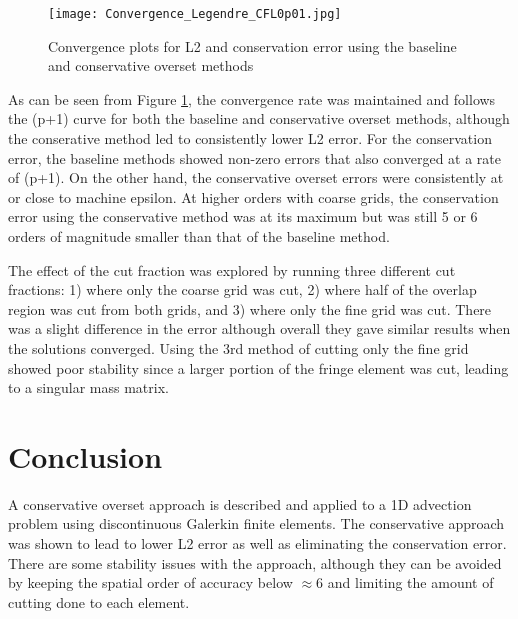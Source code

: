 \documentclass[11pt]{article}
\begin{document}
\begin{figure}
\centering
  \texttt{[image: Convergence\_Legendre\_CFL0p01.jpg]}
  \caption{Convergence plots for L2 and conservation error using the baseline and conservative overset methods}
  \label{fig:error1}
\end{figure}

As can be seen from Figure \ref{fig:error1}, the convergence rate was maintained and 
follows the (p+1) curve for both the baseline and conservative overset methods, although
the conserative method led to consistently lower L2 error. For the conservation error, 
the baseline methods showed non-zero errors that also converged at a rate of (p+1). On
the other hand, the conservative overset errors were consistently at or close to machine epsilon. 
At higher orders with coarse grids, the conservation error using the conservative method was at
its maximum but was still 5 or 6 orders of magnitude smaller than that of the baseline method. 

The effect of the cut fraction was explored by running three different cut fractions: 1)
where only the coarse grid was cut, 2) where half of the overlap region was cut from
both grids, and 3) where only the fine grid was cut. There was a slight difference in the
error although overall they gave similar results when the solutions converged. Using the
3rd method of cutting only the fine grid showed poor stability since a larger 
portion of the fringe element was cut, leading to a singular mass matrix. 

\section{Conclusion}
A conservative overset approach is described and applied to a 1D advection problem using
discontinuous Galerkin finite elements. The conservative approach was shown to lead to lower
L2 error as well as eliminating the conservation error. There are some stability issues with 
the approach, although they can be avoided by keeping the spatial order of accuracy below $\approx 6$
and limiting the amount of cutting done to each element. 
\end{document}
